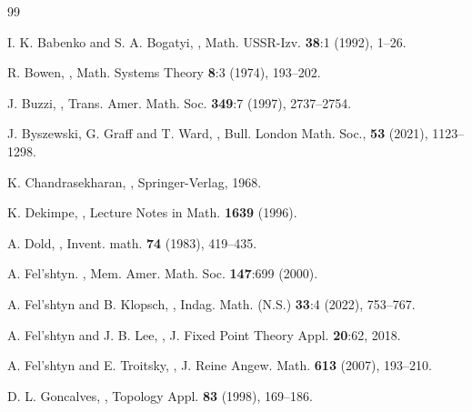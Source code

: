 \documentclass[12pt, a4paper]{amsart}
\begin{document}
\bigskip
\begin{thebibliography}{99}

{\sc I. K. Babenko and S. A. Bogatyi},
,
\newblock Math. USSR-Izv. {\bf 38}:1 (1992), 1--26.


{\sc R. Bowen},
,
\newblock Math. Systems Theory \textbf{8}:3 (1974), 193--202.

{\sc J. Buzzi},
,
\newblock Trans. Amer. Math. Soc. \textbf{349}:7 (1997), 2737--2754.

{\sc J. Byszewski, G. Graff and T. Ward},
,
\newblock Bull. London Math. Soc., {\bf 53} (2021), 1123--1298.

{\sc K. Chandrasekharan},
,
\newblock Springer-Verlag, 1968.


{\sc K. Dekimpe},
,
\newblock Lecture Notes in Math. \textbf{1639} (1996).

{\sc A. Dold},
,
\newblock Invent. math. \textbf{74} (1983), 419--435.

{\sc A. Fel'shtyn}.
,
\newblock Mem. Amer. Math. Soc. {\bf 147}:699 (2000).


{\sc A. Fel'shtyn and B. Klopsch},
,
\newblock Indag. Math. (N.S.) {\bf 33}:4 (2022), 753--767.

{\sc A. Fel'shtyn and J. B. Lee},
,
\newblock J. Fixed Point Theory Appl. {\bf 20}:62, 2018.

{\sc A. Fel'shtyn and E. Troitsky},
,
\newblock J. Reine Angew. Math. {\bf 613} (2007), 193--210.

{\sc D. L. Goncalves},
,
\newblock Topology Appl. {\bf 83} (1998), 169--186.


\end{thebibliography}
\end{document}
